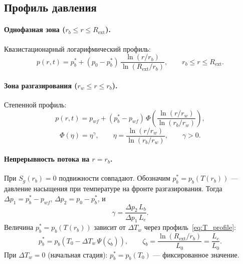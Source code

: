 \documentclass[12pt,a4paper]{article}
\newcommand{\ext}{\mathrm{ext}}
\begin{document}
\subsection{Профиль давления}

\paragraph{Однофазная зона ($r_b \leqslant r \leqslant R_\ext$).}
Квазистационарный логарифмический профиль:
\begin{equation}\label{eq:p_outer}
  p(r,t) = p_b^* + (p_0 - p_b^*)\,
    \frac{\ln(r/r_b)}{\ln(R_\ext/r_b)},
  \qquad r_b \leqslant r \leqslant R_\ext.
\end{equation}

\paragraph{Зона разгазирования ($r_w \leqslant r \leqslant r_b$).}
Степенной профиль:
\begin{equation}\label{eq:p_inner}
  p(r,t) = p_{wf} + (p_b^* - p_{wf})\,\Phi\!\left(
    \frac{\ln(r/r_w)}{\ln(r_b/r_w)}
  \right),
\end{equation}
\begin{equation}\label{eq:Phi}
  \Phi(\eta) = \eta^\gamma, \qquad
  \eta = \frac{\ln(r/r_w)}{\ln(r_b/r_w)},
  \qquad \gamma > 0.
\end{equation}

\paragraph{Непрерывность потока на $r = r_b$.}
При $S_g(r_b) = 0$ подвижности совпадают.
Обозначим $p_b^* = p_b(T(r_b))$ --- давление насыщения
при температуре на фронте разгазирования.
Тогда $\Delta p_1 = p_b^* - p_{wf}$,
$\Delta p_2 = p_0 - p_b^*$, и
\begin{equation}\label{eq:gamma_constraint}
  \gamma = \frac{\Delta p_2\,L_b}{\Delta p_1\,L_e}.
\end{equation}
Величина $p_b^* = p_b(T(r_b))$ зависит от $\Delta T_w$
через профиль~\eqref{eq:T_profile}:
\begin{equation}\label{eq:pb_star}
  p_b^* = p_b\!\left(T_0 - \Delta T_w\,\Psi(\zeta_b)\right),
  \qquad
  \zeta_b = \frac{\ln(R_\ext/r_b)}{L_0} = \frac{L_e}{L_0}.
\end{equation}
При $\Delta T_w = 0$ (начальная стадия):
$p_b^* = p_b(T_0)$ --- фиксированное значение.
\end{document}
